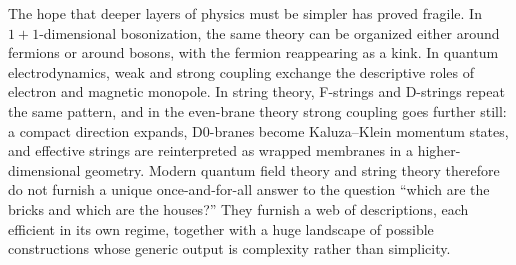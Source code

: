 The hope that deeper layers of physics must be simpler has proved fragile. In \(1+1\)-dimensional bosonization, the same theory can be organized either around fermions or around bosons, with the fermion reappearing as a kink. In quantum electrodynamics, weak and strong coupling exchange the descriptive roles of electron and magnetic monopole. In string theory, F-strings and D-strings repeat the same pattern, and in the even-brane theory strong coupling goes further still: a compact direction expands, D0-branes become Kaluza--Klein momentum states, and effective strings are reinterpreted as wrapped membranes in a higher-dimensional geometry. Modern quantum field theory and string theory therefore do not furnish a unique once-and-for-all answer to the question ``which are the bricks and which are the houses?'' They furnish a web of descriptions, each efficient in its own regime, together with a huge landscape of possible constructions whose generic output is complexity rather than simplicity.
